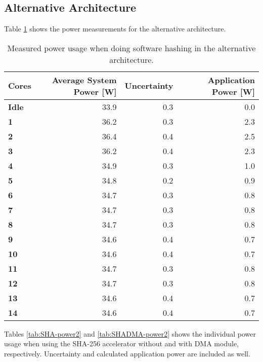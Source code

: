 \begin{appendix}
\subsection{Alternative Architecture}

Table \ref{tab:SW-power2} shows the power measurements for the alternative architecture.

\begin{table}
\centering
\begin{tabular}{| l | r | r || r |}
  \hline 
  \textbf{Cores} & \textbf{Average System Power [W]} & \textbf{Uncertainty} & \textbf{Application Power [W]} \\
  \hline                         
  \textbf{Idle} & 33.9 & 0.3 & 0.0\\
  \textbf{1} & 36.2 & 0.3 & 2.3\\
  \textbf{2} & 36.4 & 0.4 & 2.5\\
  \textbf{3} & 36.2 & 0.4 & 2.3\\
  \textbf{4} & 34.9 & 0.3 & 1.0\\
  \textbf{5} & 34.8 & 0.2 & 0.9\\
  \textbf{6} & 34.7 & 0.3 & 0.8\\
  \textbf{7} & 34.7 & 0.3 & 0.8\\
  \textbf{8} & 34.7 & 0.3 & 0.8\\
  \textbf{9} & 34.6 & 0.4 & 0.7\\
  \textbf{10} & 34.6 & 0.4 & 0.7\\
  \textbf{11} & 34.7 & 0.3 & 0.8\\
  \textbf{12} & 34.7 & 0.3 & 0.8\\
  \textbf{13} & 34.6 & 0.4 & 0.7\\
  \textbf{14} & 34.6 & 0.4 & 0.7\\
  \hline 
\end{tabular}
\caption{Measured power usage when doing software hashing in the alternative architecture.}
\label{tab:SW-power2}
\end{table}

Tables \ref{tab:SHA-power2} and \ref{tab:SHADMA-power2} shows the individual power usage when using the SHA-256 accelerator without and with DMA module, respectively. 
Uncertainty and calculated application power are included as well.


\end{appendix}
